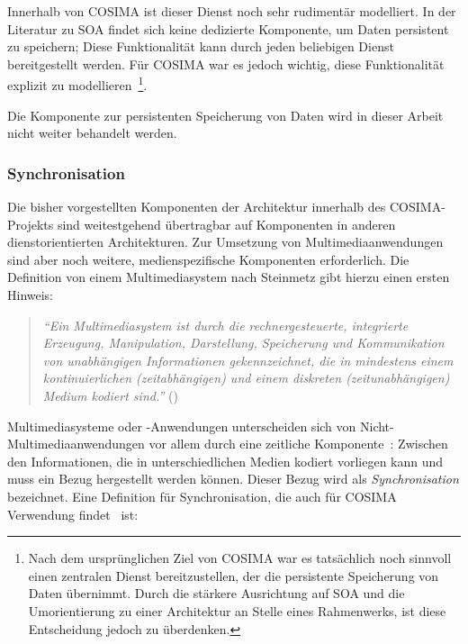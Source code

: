   Innerhalb von COSIMA ist dieser Dienst noch sehr rudimentär modelliert. In der Literatur zu SOA findet sich keine dedizierte Komponente, um Daten persistent zu speichern; Diese Funktionalität kann durch jeden beliebigen Dienst bereitgestellt werden. Für COSIMA war es jedoch wichtig, diese Funktionalität explizit zu modellieren~\citep{bericht}\footnote{Nach dem  ursprünglichen Ziel von COSIMA war es tatsächlich noch sinnvoll einen zentralen Dienst bereitzustellen, der die persistente Speicherung von Daten übernimmt. Durch die stärkere Ausrichtung auf SOA und die Umorientierung zu einer Architektur an Stelle eines Rahmenwerks, ist diese Entscheidung jedoch zu überdenken.}.
  
  Die Komponente zur persistenten Speicherung von Daten wird in dieser Arbeit nicht weiter behandelt werden.


\subsubsection{Synchronisation} %
\label{ssub:synchronisation}

  Die bisher vorgestellten Komponenten der Architektur innerhalb des COSIMA-Projekts sind weitestgehend übertragbar auf Komponenten in anderen dienstorientierten Architekturen. Zur Umsetzung von Multimediaanwendungen sind aber noch weitere, medienspezifische Komponenten erforderlich. Die Definition von einem Multimediasystem nach Steinmetz gibt hierzu einen ersten Hinweis:
  
  \begin{quote}
    \emph{"`Ein Multimediasystem ist durch die rechnergesteuerte, integrierte Erzeugung, Manipulation, Darstellung, Speicherung und Kommunikation von unabhängigen Informationen gekennzeichnet, die in mindestens einem kontinuierlichen (zeitabhängigen) und einem diskreten (zeitunabhängigen) Medium kodiert sind."'} (\citep[S. 13]{multimedia_technologie})
  \end{quote}
  
  Multimediasysteme oder -Anwendungen unterscheiden sich von Nicht-Multimediaanwendungen vor allem durch eine zeitliche Komponente~\citep[S. 14]{multimedia_technologie}: Zwischen den Informationen, die in unterschiedlichen Medien kodiert vorliegen kann und muss ein Bezug hergestellt werden können. Dieser Bezug wird als \emph{Synchronisation} bezeichnet. Eine Definition für Synchronisation, die auch für COSIMA Verwendung findet~\citep[S. 27]{bericht} ist:
  

